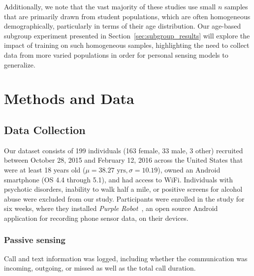 \documentclass[acmlarge]{acmart}
\begin{document}
Additionally, we note that the vast majority of these studies use small $n$ samples that are primarily drawn from student populations, which are often homogeneous demographically, particularly in terms of their age distribution. Our age-based subgroup experiment presented in Section~\ref{sec:subgroup_results} will explore the impact of training on such homogeneous samples, highlighting the need to collect data from more varied populations in order for personal sensing models to generalize.

\section{Methods and Data}
\label{sec:methods}

\subsection{Data Collection}
\label{subsec:data_collection}

Our dataset consists of 199 individuals (163 female, 33 male, 3 other) recruited between October 28, 2015 and February 12, 2016 across the United States that were at least 18 years old ($\mu = 38.27 \text{ yrs}, \sigma=10.19$), owned an Android smartphone (OS 4.4 through 5.1), and had access to WiFi. Individuals with psychotic disorders, inability to walk half a mile, or positive screens for alcohol abuse were excluded from our study. Participants were enrolled in the study for six weeks, where they installed \textit{Purple Robot}~\cite{purplerobot}, an open source Android application for recording phone sensor data, on their devices. 

\subsubsection*{Passive sensing}
Call and text information was logged, including whether the communication was incoming, outgoing, or missed as well as the total call duration. 
\end{document}
